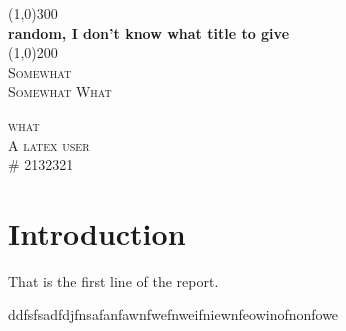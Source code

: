 \documentclass{article} %
\begin{document}
\begin{titlepage}
	\begin{center}
	\line(1,0){300}\\
	[0.25in]
	\huge{\bfseries random, I don't know what title to give}\\
	[2mm]
	\line(1,0){200}\\
	[1.5cm]
	\textsc{\LARGE Somewhat}\\
	\textsc{\Large Somewhat What}\\
	[10cm]
	\end{center}
	\begin{flushright}
	\textsc{\large what\\
	A latex user\\
	\# 2132321\\}
	\end{flushright}
\end{titlepage}
\section{Introduction}\label{sec:intro}


That is the first line of the report. 

ddfsfsadfdjfnsafanfawnfwefnweifniewnfeowinofnonfowe\\
\lipsum[1]
\end{document}
